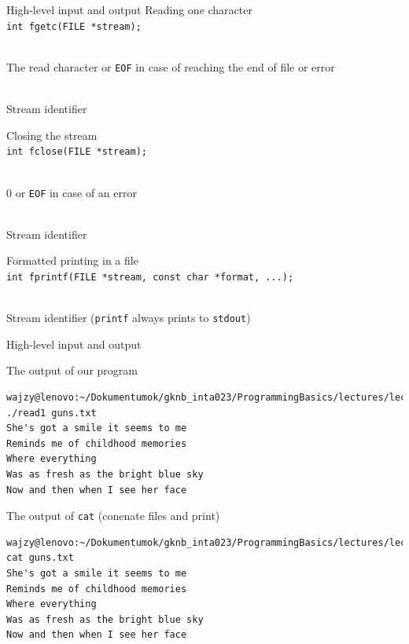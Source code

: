 \documentclass[usenames,dvipsnames,aspectratio=169]{beamer}
\begin{document}
\begin{frame}{High-level input and output}
  Reading one character\\
  \footnotesize
  \texttt{int fgetc(FILE *stream);} \\
  \begin{description}[mm]
    \item[Return value] \hfill \\
      The read character or \texttt{EOF} in case of reaching the end of file or error
    \item[\texttt{stream}] \hfill \\
      Stream identifier
  \end{description}
  \normalsize
  Closing the stream\\
  \footnotesize
  \texttt{int fclose(FILE *stream);} \\
  \begin{description}[mm]
    \item[Return value] \hfill \\
      0 or \texttt{EOF} in case of an error
    \item[\texttt{stream}] \hfill \\
      Stream identifier
  \end{description}
  \normalsize
  Formatted printing in a file\\
  \footnotesize
  \texttt{int fprintf(FILE *stream, const char *format, ...);} \\
  \begin{description}[mm]
    \item[\texttt{stream}] \hfill \\
      Stream identifier (\texttt{printf} always prints to \texttt{stdout})
  \end{description}
\end{frame}

\begin{frame}[fragile]{High-level input and output}
  \begin{block}{The output of our program}
    \footnotesize
    \begin{verbatim}
wajzy@lenovo:~/Dokumentumok/gknb_inta023/ProgrammingBasics/lectures/lecture13$ 
./read1 guns.txt 
She's got a smile it seems to me
Reminds me of childhood memories
Where everything
Was as fresh as the bright blue sky
Now and then when I see her face
\end{verbatim}
  \end{block}
  \begin{block}{The output of \texttt{cat} (conenate files and print)}
    \footnotesize
    \begin{verbatim}
wajzy@lenovo:~/Dokumentumok/gknb_inta023/ProgrammingBasics/lectures/lecture13$ 
cat guns.txt
She's got a smile it seems to me
Reminds me of childhood memories
Where everything
Was as fresh as the bright blue sky
Now and then when I see her face
\end{verbatim}
  \end{block}
\end{frame}
\end{document}
